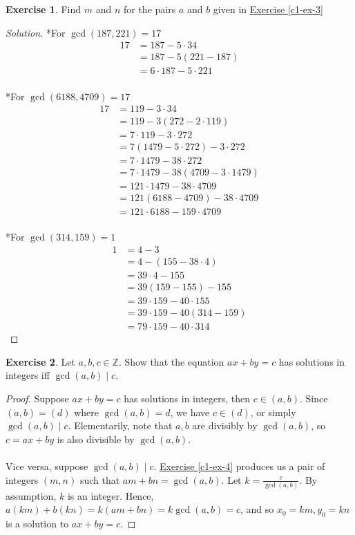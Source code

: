 \documentclass{article}
\theoremstyle{definition}
\newtheorem{exercise}{Exercise}
\begin{document}
\newpage

\begin{exercise}
Find $m$ and $n$ for the pairs $a$ and $b$ given in \hyperref[c1-ex-3]{Exercise \ref*{c1-ex-3}}
\end{exercise}
\begin{proof}[Solution]
*For $\gcd(187, 221) = 17$
\begin{align*}
17 & = 187 - 5 \cdot 34 \\
& = 187 - 5 (221 - 187) \\
& = 6 \cdot 187 - 5 \cdot 221
\end{align*}
\\
*For $\gcd(6188, 4709) = 17$
\begin{align*}
17 & = 119 - 3 \cdot 34 \\
& = 119 - 3 (272 - 2 \cdot 119) \\
& = 7 \cdot 119 - 3 \cdot 272 \\
& = 7 (1479 - 5 \cdot 272) - 3 \cdot 272 \\
& = 7 \cdot 1479 - 38 \cdot 272 \\
& = 7 \cdot 1479 - 38 (4709 - 3 \cdot 1479) \\
& = 121 \cdot 1479 - 38 \cdot 4709 \\
& = 121 (6188 - 4709) - 38 \cdot 4709 \\
& = 121 \cdot 6188 - 159 \cdot 4709
\end{align*}
\\
*For $\gcd(314, 159) = 1$
\begin{align*}
1 & = 4 - 3 \\
& = 4 - (155 - 38 \cdot 4) \\
& = 39 \cdot 4 - 155 \\
& = 39 (159 - 155) - 155 \\
& = 39 \cdot 159 - 40 \cdot 155 \\
& = 39 \cdot 159 - 40 (314 - 159) \\
& = 79 \cdot 159 - 40 \cdot 314
\end{align*}
\end{proof}

\newpage

\begin{exercise} \label{c1-ex-6}
Let $a, b, c \in \mathbb{Z}$. Show that the equation $ax + by = c$ has solutions in integers iff $\gcd(a, b) \mid c$.
\end{exercise}
\begin{proof}
Suppose $ax + by = c$ has solutions in integers, then $c \in (a, b)$. Since $(a, b) = (d)$ where $\gcd(a, b) = d$, we have $c \in (d)$, or simply $\gcd(a, b) \mid c$. Elementarily, note that $a, b$ are divisibly by $\gcd(a, b)$, so $c = ax + by$ is also divisible by $\gcd(a, b)$.
\\
\\
Vice versa, suppose $\gcd(a, b) \mid c$. \hyperref[c1-ex-4]{Exercise \ref*{c1-ex-4}} produces us a pair of integers $(m, n)$ such that $a m + b n = \gcd(a, b)$. Let $k = \frac{c}{\gcd(a, b)}$. By assumption, $k$ is an integer. Hence, $a (km) + b (kn) = k (am + bn) = k \gcd(a, b) = c$, and so $x_0 = km, y_0 = kn$ is a solution to $ax + by = c$.
\end{proof}
\end{document}
